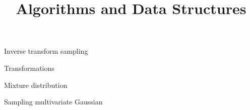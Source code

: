 \documentclass[11pt,compress,t,notes=noshow, xcolor=table]{beamer}
\title{Algorithms and Data Structures}
\begin{document}
{
  \item Inverse transform sampling
  \item Transformations
  \item Mixture distribution
  \item Sampling multivariate Gaussian
}


% 
% 
% 
% 

\end{document}
